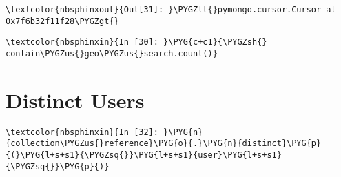 \documentclass[letterpaper,10pt,english]{sphinxmanual}
\begin{document}
%
\begin{Verbatim}[commandchars=\\\{\}]
\textcolor{nbsphinxout}{Out[31]: }\PYGZlt{}pymongo.cursor.Cursor at 0x7f6b32f11f28\PYGZgt{}
\end{Verbatim}

%
\begin{Verbatim}[commandchars=\\\{\}]
\textcolor{nbsphinxin}{In [30]: }\PYG{c+c1}{\PYGZsh{} contain\PYGZus{}geo\PYGZus{}search.count()}
\end{Verbatim}

%
\begin{sphinxVerbatim}[commandchars=\\\{\}]
\end{sphinxVerbatim}


\section{Distinct Users}
\label{\detokenize{04-mongo/04-01-poking-around:Distinct-Users}}
%
\begin{Verbatim}[commandchars=\\\{\}]
\textcolor{nbsphinxin}{In [32]: }\PYG{n}{collection\PYGZus{}reference}\PYG{o}{.}\PYG{n}{distinct}\PYG{p}{(}\PYG{l+s+s1}{\PYGZsq{}}\PYG{l+s+s1}{user}\PYG{l+s+s1}{\PYGZsq{}}\PYG{p}{)}
\end{Verbatim}
\end{document}
